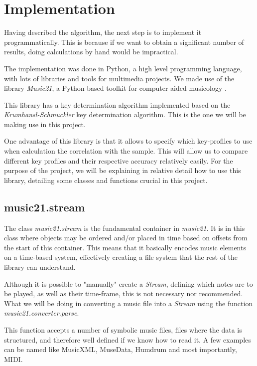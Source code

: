 \section{Implementation} \label{sec:implementation}

Having described the algorithm, the next step is to implement it programmatically.
This is because if we want to obtain a significant number of results, doing calculations by hand would be impractical.

The implementation was done in Python, a high level programming language, with lots of libraries and tools for multimedia projects.
We made use of the library \textit{Music21}, a Python-based toolkit for computer-aided musicology \cite{music21}.

This library has a key determination algorithm implemented based on the \textit{Krumhansl-Schmuckler} key determination algorithm.
This is the one we will be making use in this project.

One advantage of this library is that it allows to specify which key-profiles to use when calculation the correlation with the sample.
This will allow us to compare different key profiles and their respective accuracy relatively easily.
For the purpose of the project, we will be explaining in relative detail how to use this library, detailing some classes and functions crucial in this project.

\subsection {music21.stream}

The class \textit{music21.stream} is the fundamental container in \textit{music21}.
It is in this class where objects may be ordered and/or placed in time based on offsets from the start of this container.
This means that it basically encodes music elements on a time-based system, effectively creating a file system that the rest of the library can understand.

Although it is possible to "manually" create a \textit{Stream}, defining which notes are to be played, as well as their time-frame, this is not necessary nor recommended.
What we will be doing in converting a music file into a \textit{Stream} using the function \textit{music21.converter.parse}.

This function accepts a number of symbolic music files, files where the data is structured, and therefore well defined if we know how to read it.
A few examples can be named like MusicXML, MuseData, Humdrum and most importantly, MIDI.

